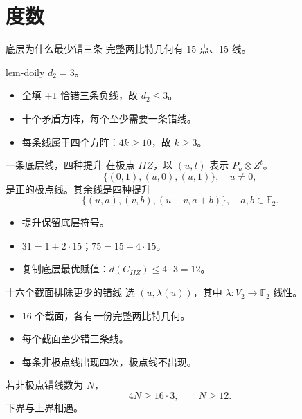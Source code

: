\documentclass{beamer}
\begin{document}
\section{度数}
\begin{frame}{底层为什么最少错三条}
完整两比特几何有 15 点、15 线。
\begin{bookresult}{lem-doily}
$d_2=3$。
\end{bookresult}
\begin{itemize}
\item 全填 $+1$ 恰错三条负线，故 $d_2\le3$。
\item 十个矛盾方阵，每个至少需要一条错线。
\item 每条线属于四个方阵：$4k\ge10$，故 $k\ge3$。
\end{itemize}
\end{frame}
\begin{frame}{一条底层线，四种提升}
在极点 $IIZ$，以 $(u,t)$ 表示 $P_u\otimes Z^t$。
\[
\{(0,1),(u,0),(u,1)\},\quad u\ne0,
\]
是正的极点线。其余线是四种提升
\[
\{(u,a),(v,b),(u+v,a+b)\},\quad a,b\in\mathbb F_2.
\]
\begin{itemize}
\item 提升保留底层符号。
\item $31=1+2\cdot15$；$75=15+4\cdot15$。
\item 复制底层最优赋值：$d(C_{IIZ})\le4\cdot3=12$。
\end{itemize}
\end{frame}
\begin{frame}{十六个截面排除更少的错线}
选 $(u,\lambda(u))$，其中 $\lambda:V_2\to\mathbb F_2$ 线性。
\begin{itemize}
\item 16 个截面，各有一份完整两比特几何。
\item 每个截面至少错三条线。
\item 每条非极点线出现四次，极点线不出现。
\end{itemize}
若非极点错线数为 $N$，
\[4N\ge16\cdot3,\qquad N\ge12.\]
下界与上界相遇。
\end{frame}
\end{document}
